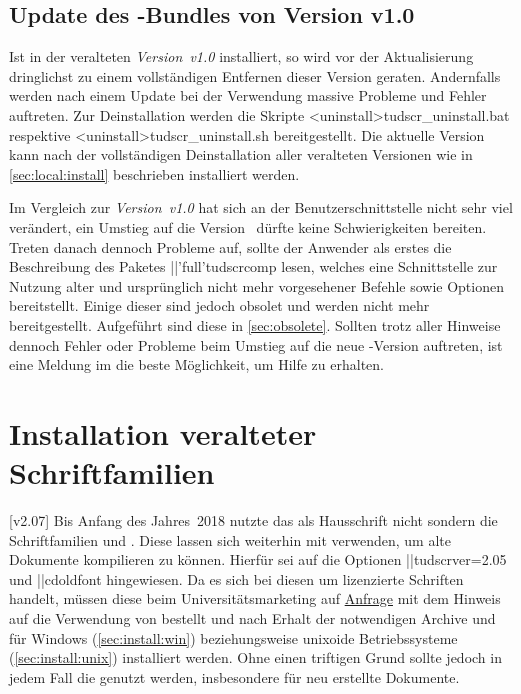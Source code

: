 \subsection{Update des \TUDScript-Bundles von Version v1.0}
%
Ist \TUDScript in der veralteten \emph{Version~v1.0} installiert, so wird vor 
der Aktualisierung dringlichst zu einem vollständigen Entfernen dieser Version 
geraten. Andernfalls werden nach einem Update bei der Verwendung massive 
Probleme und Fehler auftreten. Zur Deinstallation werden die Skripte 
\GitHubDownload*<uninstall>{tudscr_uninstall.bat} respektive
\GitHubDownload*<uninstall>{tudscr_uninstall.sh} bereitgestellt. Die aktuelle 
Version~\vTUDScript{} kann nach der vollständigen Deinstallation aller 
veralteten Versionen wie in \autoref{sec:local:install} beschrieben installiert 
werden.

Im Vergleich zur \emph{Version~v1.0} hat sich an der Benutzerschnittstelle 
nicht sehr viel verändert, ein Umstieg auf die Version~\vTUDScript{} dürfte 
keine Schwierigkeiten bereiten. Treten danach dennoch Probleme auf, sollte der 
Anwender als erstes die Beschreibung des Paketes \Package||'full'{tudscrcomp} 
lesen, welches eine Schnittstelle zur Nutzung alter und ursprünglich nicht mehr 
vorgesehener Befehle sowie Optionen bereitstellt. Einige dieser sind jedoch 
obsolet und werden nicht mehr bereitgestellt. Aufgeführt sind diese in 
\autoref{sec:obsolete}. Sollten trotz aller Hinweise dennoch Fehler oder 
Probleme beim Umstieg auf die neue \TUDScript-Version auftreten, ist eine 
Meldung im \Forum die beste Möglichkeit, um Hilfe zu erhalten.



\section{%
  Installation veralteter Schriftfamilien%
  \label{sec:install:fonts}%
}
%
%
[v2.07]
Bis Anfang des Jahres~2018 nutzte das \TUDCD als Hausschrift nicht \OpenSans 
sondern die Schriftfamilien \Univers und \DIN. Diese lassen sich weiterhin mit 
\TUDScript verwenden, um alte Dokumente kompilieren zu können. Hierfür sei auf 
die Optionen \Option||{tudscrver=2.05} und \Option||{cdoldfont} hingewiesen. 
Da es sich bei diesen um lizenzierte Schriften handelt, müssen diese beim 
Universitätsmarketing auf \href{https://tu-dresden.de/cd}{Anfrage} mit dem 
Hinweis auf die Verwendung von  bestellt und nach Erhalt der 
notwendigen Archive  und  für 
Windows (\autoref{sec:install:win}) beziehungsweise unixoide Betriebssysteme 
(\autoref{sec:install:unix}) installiert werden. Ohne einen triftigen Grund 
sollte jedoch in jedem Fall die \OpenSans genutzt werden, insbesondere für neu 
erstellte Dokumente.

